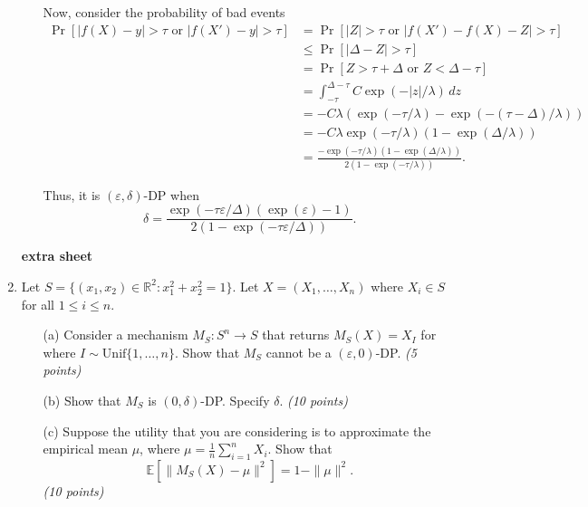 \documentclass[12pt]{article}
\begin{document}
\begin{enumerate}
\begin{solution}
\begin{enumerate}
Now, consider the probability of bad events
\begin{align*}
\Pr[|f(X) - y| > \tau \text{ or } |f(X') - y| > \tau]
&= \Pr[|Z| > \tau \text{ or } |f(X') - f(X) - Z| > \tau] \\
&\leq \Pr[|\Delta - Z| > \tau] \\
&= \Pr[Z > \tau + \Delta \text{ or } Z < \Delta - \tau] \\
&= \int_{-\tau}^{\Delta - \tau} C \exp(-|z|/\lambda) \, dz \\
&= -C\lambda \left( \exp(-\tau/\lambda) - \exp(-(\tau - \Delta)/\lambda) \right) \\
&= -C\lambda \exp(-\tau/\lambda)(1 - \exp(\Delta/\lambda)) \\
&= \frac{-\exp(-\tau/\lambda)(1 - \exp(\Delta/\lambda))}{2(1 - \exp(-\tau/\lambda))}.
\end{align*}

Thus, it is $(\varepsilon, \delta)$-DP when
\[
\delta = \frac{\exp(-\tau \varepsilon / \Delta)(\exp(\varepsilon) - 1)}{2(1 - \exp(-\tau \varepsilon / \Delta))}.
\]
\end{enumerate}

\end{solution}

\begin{problem}
    \newpage
    {\bf extra sheet}
    \newpage
\end{problem}
\item Let $S = \{(x_1, x_2) \in \mathbb{R}^2 : x_1^2 + x_2^2 = 1\}$. Let $X = (X_1, \dots, X_n)$ where $X_i \in S$ for all $1 \le i \le n$.

\begin{enumerate}
    \item[(a)] Consider a mechanism $M_S : S^n \rightarrow S$ that returns $M_S(X) = X_I$ for where $I \sim \mathrm{Unif}\{1, \dots, n\}$. Show that $M_S$ cannot be a $(\varepsilon, 0)$-DP. \textit{(5 points)}
    
    \item[(b)] Show that $M_S$ is $(0, \delta)$-DP. Specify $\delta$. \textit{(10 points)}
    
    \item[(c)] Suppose the utility that you are considering is to approximate the empirical mean $\mu$, where $\mu = \frac{1}{n} \sum_{i=1}^{n} X_i$. Show that
    \[
    \mathbb{E}[\|M_S(X) - \mu\|^2] = 1 - \|\mu\|^2.
    \]
    \textit{(10 points)}
\end{enumerate}


\end{enumerate}
\end{document}
